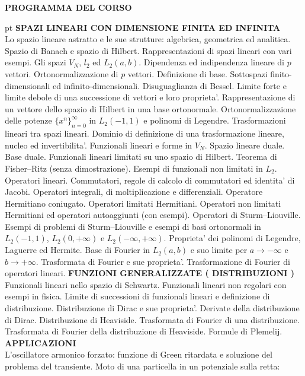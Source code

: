 \documentclass[a4paper,10pt]{article}
\begin{document}
\centerline{\textbf{PROGRAMMA DEL CORSO}} 
 pt
\noindent
\textbf{SPAZI LINEARI CON DIMENSIONE FINITA ED INFINITA}\\
Lo spazio lineare astratto e le sue strutture: algebrica, geometrica ed analitica. Spazio di Banach e spazio di Hilbert. Rappresentazioni di spazi lineari con vari esempi. Gli spazi $V_N$, $l_2$ ed $L_2(a,b)$. Dipendenza ed indipendenza lineare di $p$ vettori. Ortonormalizzazione di $p$ vettori. Definizione di base. Sottospazi finito-dimensionali ed infinito-dimensionali. Disuguaglianza di Bessel. Limite forte e limite debole di una successione di vettori e loro proprieta'. Rappresentazione di un vettore dello spazio di Hilbert in una base ortonormale. Ortonormalizzazione delle potenze $\{x^n\}^{\infty}_{n=0}$ in $L_2(-1,1)$ e polinomi di Legendre. Trasformazioni lineari tra spazi lineari. Dominio di definizione di una trasformazione lineare, nucleo ed invertibilita'. Funzionali lineari e forme in $V_N$. Spazio lineare duale. Base duale. Funzionali lineari limitati su uno spazio di Hilbert. Teorema di Fisher--Ritz (senza dimostrazione). Esempi di funzionali non limitati in $L_2$. Operatori lineari. Commutatori, regole di calcolo di commutatori ed identita' di Jacobi. Operatori integrali, di moltiplicazione e differenziali. Operatore Hermitiano coniugato. Operatori limitati Hermitiani. Operatori non limitati Hermitiani ed operatori autoaggiunti (con esempi). Operatori di Sturm--Liouville. Esempi di problemi di Sturm--Liouville e esempi di basi ortonormali in $L_2(-1,1)$, $L_2(0,+\infty)$ e $L_2(-\infty,+\infty)$. Proprieta' dei polinomi di Legendre, Laguerre ed Hermite. Base di Fourier in $L_2(a,b)$ e suo limite per $a\rightarrow -\infty$ e $b\rightarrow +\infty$. Trasformata di Fourier e sue proprieta'. Trasformazione di Fourier di operatori lineari.
\vskip 12pt
\noindent
\textbf{FUNZIONI GENERALIZZATE ( DISTRIBUZIONI )}\\
Funzionali lineari nello spazio di Schwartz. Funzionali lineari non regolari con esempi in fisica. Limite di successioni di funzionali lineari e definizione di distribuzione. Distribuzione di Dirac e sue proprieta'. Derivate della distribuzione di Dirac. Distribuzione di Heaviside. Trasformata di Fourier di una distribuzione. Trasformata di Fourier della distribuzione di Heaviside. Formule di Plemelij.
\vskip 12pt
\noindent
\textbf{APPLICAZIONI}\\
L'oscillatore armonico forzato: funzione di Green ritardata e soluzione del problema del transiente.
Moto di una particella in un potenziale sulla retta:
\end{document}
